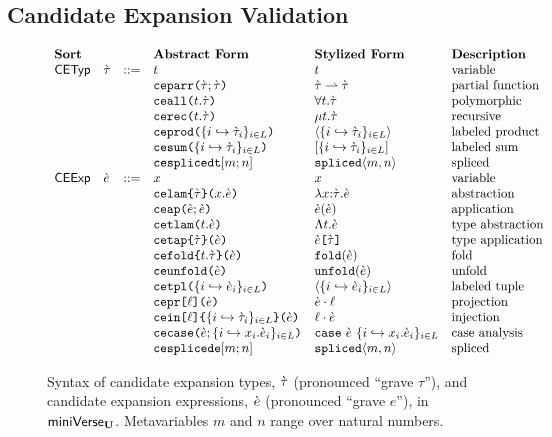 \subsection{Candidate Expansion Validation}
\begin{figure}
$\begin{array}{lllllll}
\textbf{Sort} & & & \textbf{Abstract Form} & \textbf{Stylized Form} & \textbf{Description}\\
\mathsf{CETyp} & \grave{\tau} & ::= & t & t & \text{variable}\\
&&& \texttt{ceparr}\texttt{(}\grave{\tau}; \grave{\tau}\texttt{)} & \grave{\tau} \rightharpoonup \grave{\tau} & \text{partial function}\\
&&& \texttt{ceall}\texttt{(}t.\grave{\tau}\texttt{)} & \forall t.\grave{\tau} & \text{polymorphic}\\
&&& \texttt{cerec}\texttt{(}t.\grave{\tau}\texttt{)} & \mu t.\grave{\tau} & \text{recursive}\\
&&& \texttt{ceprod}\texttt{(}\{i \hookrightarrow \grave{\tau}_{i}\}_{i \in L}\texttt{)} & \langle \{i \hookrightarrow \grave{\tau}_{i}\}_{i \in L} \rangle & \text{labeled product}\\
&&& \texttt{cesum}\texttt{(}\{i \hookrightarrow \grave{\tau}_{i}\}_{i \in L}\texttt{)} & [\{i \hookrightarrow \grave{\tau}_{i}\}_{i \in L}] & \text{labeled sum}\\
&&& \texttt{cesplicedt}[m; n] & \texttt{spliced}\langle m, n\rangle & \text{spliced}\\
\mathsf{CEExp} & \grave{e} & ::= & x & x & \text{variable}\\
&&& \texttt{celam}\texttt{\{}\grave{\tau}\texttt{\}(}x.\grave{e}\texttt{)} & \lambda x{:}\grave{\tau}.\grave{e} & \text{abstraction}\\
&&& \texttt{ceap}\texttt{(}\grave{e}; \grave{e}\texttt{)} & \grave{e}(\grave{e}) & \text{application}\\
&&& \texttt{cetlam}\texttt{(}t.\grave{e}\texttt{)} & \Lambda t.\grave{e} & \text{type abstraction}\\
&&& \texttt{cetap}\texttt{\{}\grave{\tau}\texttt{\}(}\grave{e}\texttt{)} & \grave{e}\texttt{[}\grave{\tau}\texttt{]} & \text{type application}\\
&&& \texttt{cefold}\texttt{\{}t.\grave{\tau}\texttt{\}(}\grave{e}\texttt{)} & \texttt{fold}(\grave{e}) & \text{fold}\\
&&& \texttt{ceunfold}\texttt{(}\grave{e}\texttt{)} & \texttt{unfold}(\grave{e}) & \text{unfold}\\
&&& \texttt{cetpl}\texttt{(}\{i \hookrightarrow \grave{e}_{i}\}_{i \in L}\texttt{)} & \langle \{i \hookrightarrow \grave{e}_{i}\}_{i \in L}\rangle & \text{labeled tuple}\\
&&& \texttt{cepr}\texttt{[}\ell\texttt{](}\grave{e}\texttt{)} & \grave{e} \cdot \ell & \text{projection}\\
&&& \texttt{cein}\texttt{[}\ell\texttt{]\{}\{i \hookrightarrow \grave{\tau}_{i}\}_{i \in L}\texttt{\}(}\grave{e}\texttt{)} & \ell \cdot \grave{e} & \text{injection}\\
&&& \texttt{cecase}\texttt{(}\grave{e}; \{i \hookrightarrow x_{i}.\grave{e}_{i}\}_{i \in L}\texttt{)} & \texttt{case}~\grave{e}~\{i \hookrightarrow x_{i}.\grave{e}_{i}\}_{i \in L} & \text{case analysis}\\
&&& \texttt{cesplicede}[m; n] & \texttt{spliced}\langle m, n\rangle & \text{spliced}
\end{array}$
\caption[Syntax of candidate expansion types and expressions in $\miniVerseU$.]{Syntax of candidate expansion types, $\grave{\tau}$ (pronounced ``grave $\tau$''), and candidate expansion expressions, $\grave{e}$ (pronounced ``grave $e$''), in $\miniVerseU$. Metavariables $m$ and $n$ range over natural numbers.}
\label{fig:U-candidate-terms}
\end{figure}

